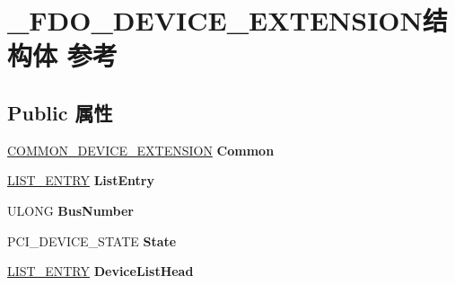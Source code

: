 \hypertarget{struct___f_d_o___d_e_v_i_c_e___e_x_t_e_n_s_i_o_n}{}\section{\+\_\+\+F\+D\+O\+\_\+\+D\+E\+V\+I\+C\+E\+\_\+\+E\+X\+T\+E\+N\+S\+I\+O\+N结构体 参考}
\label{struct___f_d_o___d_e_v_i_c_e___e_x_t_e_n_s_i_o_n}
\subsection*{Public 属性}
\begin{DoxyCompactItemize}
\item 
\mbox{\label{struct___f_d_o___d_e_v_i_c_e___e_x_t_e_n_s_i_o_n_aa1bb5ef0fe421b6a322c6af13fc4e02b}} 
\hyperlink{struct_c_o_m_m_o_n___d_e_v_i_c_e___e_x_t_e_n_s_i_o_n}{C\+O\+M\+M\+O\+N\+\_\+\+D\+E\+V\+I\+C\+E\+\_\+\+E\+X\+T\+E\+N\+S\+I\+ON} {\bfseries Common}
\item 
\mbox{\label{struct___f_d_o___d_e_v_i_c_e___e_x_t_e_n_s_i_o_n_a747ff71bf202e136017e163c00a07d01}} 
\hyperlink{struct___l_i_s_t___e_n_t_r_y}{L\+I\+S\+T\+\_\+\+E\+N\+T\+RY} {\bfseries List\+Entry}
\item 
\mbox{\label{struct___f_d_o___d_e_v_i_c_e___e_x_t_e_n_s_i_o_n_a5c379d478a703e6cbb7e695a6a9fc06b}} 
U\+L\+O\+NG {\bfseries Bus\+Number}
\item 
\mbox{\label{struct___f_d_o___d_e_v_i_c_e___e_x_t_e_n_s_i_o_n_ad68dc34031773b7f2b6e92f195fce0c5}} 
P\+C\+I\+\_\+\+D\+E\+V\+I\+C\+E\+\_\+\+S\+T\+A\+TE {\bfseries State}
\item 
\mbox{\label{struct___f_d_o___d_e_v_i_c_e___e_x_t_e_n_s_i_o_n_ae4bc2fb06cbebdc01af2a238bc48d04c}} 
\hyperlink{struct___l_i_s_t___e_n_t_r_y}{L\+I\+S\+T\+\_\+\+E\+N\+T\+RY} {\bfseries Device\+List\+Head}
\item 
\mbox{\label{struct___f_d_o___d_e_v_i_c_e___e_x_t_e_n_s_i_o_n_ab1a8dacb886637a39b7c12b8cf98e8f4}} 

\end{DoxyCompactItemize}

